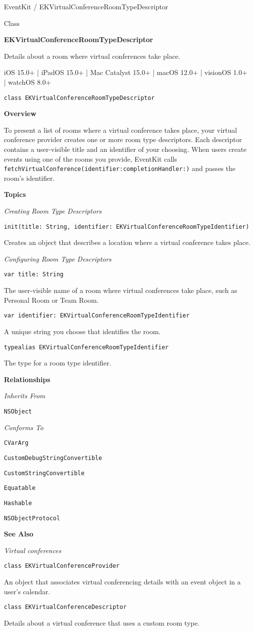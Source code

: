 \documentclass{article}
\title{}
\author{}
\date{}
\begin{document}
EventKit / EKVirtualConferenceRoomTypeDescriptor

Class

\textbf{EKVirtualConferenceRoomTypeDescriptor}

Details about a room where virtual conferences take place.

iOS 15.0+ | iPadOS 15.0+ | Mac Catalyst 15.0+ | macOS 12.0+ | visionOS 1.0+ | watchOS 8.0+

\texttt{class EKVirtualConferenceRoomTypeDescriptor}

\textbf{Overview}

To present a list of rooms where a virtual conference takes place, your virtual conference provider creates one or more room type descriptors. Each descriptor contains a user-visible title and an identifier of your choosing. When users create events using one of the rooms you provide, EventKit calls \texttt{fetchVirtualConference(identifier:completionHandler:)} and passes the room's identifier.

\textbf{Topics}

\textit{Creating Room Type Descriptors}

\texttt{init(title: String, identifier: EKVirtualConferenceRoomTypeIdentifier)}

Creates an object that describes a location where a virtual conference takes place.

\textit{Configuring Room Type Descriptors}

\texttt{var title: String}

The user-visible name of a room where virtual conferences take place, such as Personal Room or Team Room.

\texttt{var identifier: EKVirtualConferenceRoomTypeIdentifier}

A unique string you choose that identifies the room.

\texttt{typealias EKVirtualConferenceRoomTypeIdentifier}

The type for a room type identifier.

\textbf{Relationships}

\textit{Inherits From}

\texttt{NSObject}

\textit{Conforms To}

\texttt{CVarArg}

\texttt{CustomDebugStringConvertible}

\texttt{CustomStringConvertible}

\texttt{Equatable}

\texttt{Hashable}

\texttt{NSObjectProtocol}

\textbf{See Also}

\textit{Virtual conferences}

\texttt{class EKVirtualConferenceProvider}

An object that associates virtual conferencing details with an event object in a user's calendar.

\texttt{class EKVirtualConferenceDescriptor}

Details about a virtual conference that uses a custom room type.

\newpage
\end{document}
